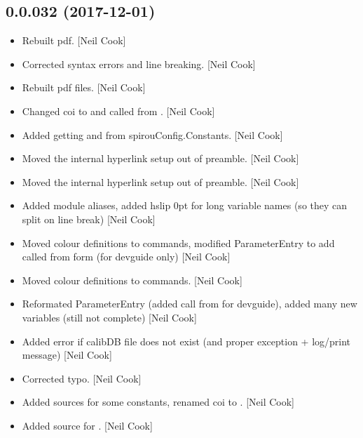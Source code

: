 \documentclass[a4paper,10pt,english]{report}
\begin{document}
\subsection{0.0.032 (2017-12-01)}
\label{\detokenize{misc/changelog:id519}}\begin{itemize}
\item {} 
Rebuilt pdf. {[}Neil Cook{]}

\item {} 
Corrected syntax errors and line breaking. {[}Neil Cook{]}

\item {} 
Rebuilt pdf files. {[}Neil Cook{]}

\item {} 
Changed coi to  and called from . {[}Neil Cook{]}

\item {} 
Added getting  and  from spirouConfig.Constants.
{[}Neil Cook{]}

\item {} 
Moved the internal hyperlink setup out of preamble. {[}Neil Cook{]}

\item {} 
Moved the internal hyperlink setup out of preamble. {[}Neil Cook{]}

\item {} 
Added module aliases, added hslip 0pt for long variable names (so they
can split on line break) {[}Neil Cook{]}

\item {} 
Moved colour definitions to commands, modified ParameterEntry to add
called from form (for devguide only) {[}Neil Cook{]}

\item {} 
Moved colour definitions to commands. {[}Neil Cook{]}

\item {} 
Reformated ParameterEntry (added call from for devguide), added many
new variables (still not complete) {[}Neil Cook{]}

\item {} 
Added error if calibDB file does not exist (and proper exception +
log/print message) {[}Neil Cook{]}

\item {} 
Corrected typo. {[}Neil Cook{]}

\item {} 
Added sources for some constants, renamed coi to . {[}Neil
Cook{]}

\item {} 
Added source for . {[}Neil Cook{]}

\end{itemize}
\end{document}
